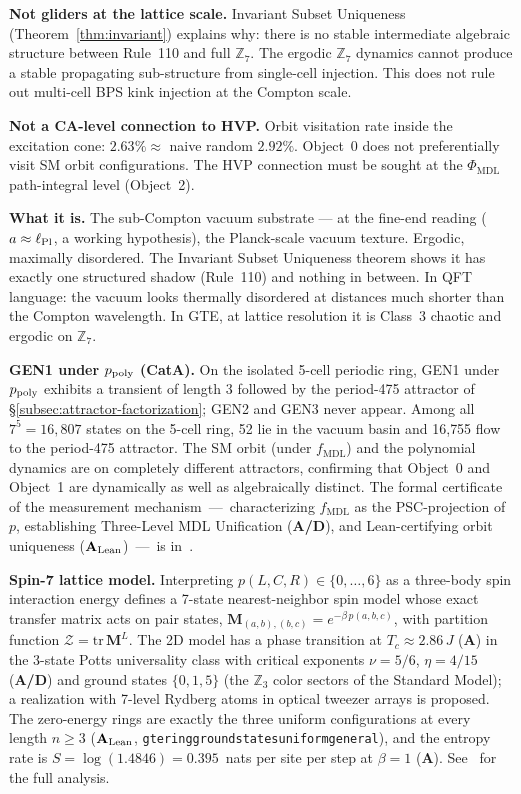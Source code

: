 \documentclass[11pt]{article}
\theoremstyle{remark}
\newcommand{\PHIMDL}{\ensuremath{\Phi_{\mathrm{MDL}}}}
\newcommand{\ZS}{\ensuremath{\mathbb{Z}_7}}
\newcommand{\lean}[1]{%
  \penalty-100
  \begingroup\def\_{\textunderscore\allowbreak}\texttt{#1}\endgroup}
\newcommand{\fmdl}{\ensuremath{f_{\mathrm{MDL}}}}
\newcommand{\CatA}{\textbf{A}}
\newcommand{\CatAL}{\texorpdfstring{\ensuremath{\textbf{A}_{\rm Lean}}}{A-Lean}}
\newcommand{\CatAD}{\textbf{A/D}}
\begin{document}
\medskip
\noindent\textbf{Not gliders at the lattice scale.}
Invariant Subset Uniqueness (Theorem~\ref{thm:invariant}) explains why: there
is no stable intermediate algebraic structure between Rule~110 and full $\ZS$.
The ergodic $\ZS$ dynamics cannot produce a stable propagating sub-structure
from single-cell injection. This does not rule out multi-cell BPS kink injection
at the Compton scale.

\medskip
\noindent\textbf{Not a CA-level connection to HVP.}
Orbit visitation rate inside the excitation cone: $2.63\% \approx$ naive random
$2.92\%$. Object~0 does not preferentially visit SM orbit configurations. The
HVP connection must be sought at the $\PHIMDL{}$ path-integral level (Object~2).

\medskip
\noindent\textbf{What it is.}
The sub-Compton vacuum substrate --- at the fine-end reading
($a \approx \ell_{\rm Pl}$, a working hypothesis), the Planck-scale vacuum
texture. Ergodic, maximally disordered. The Invariant
Subset Uniqueness theorem shows it has exactly one structured shadow (Rule~110)
and nothing in between. In QFT language: the vacuum looks thermally disordered
at distances much shorter than the Compton wavelength. In GTE, at lattice
resolution it is Class~3 chaotic and ergodic on $\ZS$.

\medskip
\noindent\textbf{GEN1 under $p_{\rm poly}$ (CatA).}
On the isolated 5-cell periodic ring, GEN1 under $p_{\rm poly}$ exhibits a
transient of length 3 followed by the period-475 attractor of
§\ref{subsec:attractor-factorization}; GEN2 and GEN3 never appear. Among
all $7^5 = 16{,}807$ states on the 5-cell ring, 52 lie in the vacuum basin
and 16{,}755 flow to the period-475 attractor.
The SM orbit (under $\fmdl{}$) and the polynomial dynamics are on completely
different attractors, confirming that Object~0 and Object~1 are dynamically as
well as algebraically distinct.
The formal certificate of the measurement mechanism~---~characterizing $\fmdl{}$
as the PSC-projection of $p$, establishing Three-Level MDL Unification (\CatAD{}),
and Lean-certifying orbit uniqueness (\CatAL{})~---~is
in~\cite{SpivackPolynomialTransputation}.

\medskip
\noindent\textbf{Spin-7 lattice model.}
Interpreting $p(L,C,R) \in \{0,\ldots,6\}$ as a three-body spin interaction
energy defines a 7-state nearest-neighbor spin model whose exact transfer
matrix acts on pair states,
$\mathbf{M}_{(a,b),(b,c)} = e^{-\beta\, p(a,b,c)}$, with partition
function $\mathcal{Z} = \mathrm{tr}\,\mathbf{M}^L$.
The 2D model has a phase transition at $T_c \approx 2.86\,J$ (\CatA{}) in the
3-state Potts universality class with critical exponents $\nu = 5/6$,
$\eta = 4/15$ (\CatAD{}) and ground states $\{0,1,5\}$ (the $\mathbb{Z}_3$
color sectors of the Standard Model); a realization with 7-level Rydberg atoms
in optical tweezer arrays is proposed.
The zero-energy rings are exactly the three uniform configurations at every
length $n \ge 3$ (\CatAL{}, \lean{gte\_ring\_ground\_states\_uniform\_general}),
and the entropy rate is $S = \log(1.4846) = 0.395$~nats per site per step at
$\beta = 1$ (\CatA{}).
See~\cite{SpivackSpin7Lattice} for the full analysis.
\end{document}
